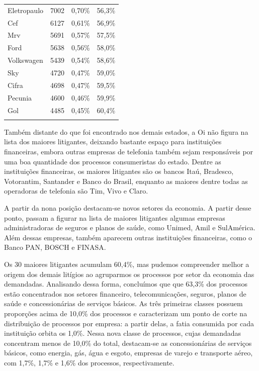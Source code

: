 \documentclass[]{report}
\begin{document}
\begin{longtable}{lrll}
  Eletropaulo & 7002 & 0,70\% & 56,3\% \\
  Cef & 6127 & 0,61\% & 56,9\% \\
  Mrv & 5691 & 0,57\% & 57,5\% \\
  Ford & 5638 & 0,56\% & 58,0\% \\
  Volkswagen & 5439 & 0,54\% & 58,6\% \\
  Sky & 4720 & 0,47\% & 59,0\% \\
  Cifra & 4698 & 0,47\% & 59,5\% \\
  Pecunia & 4600 & 0,46\% & 59,9\% \\
  Gol & 4485 & 0,45\% & 60,4\% \\
   \hline
\hline
\label{unnamed-chunk-30}
\end{longtable}

Também distante do que foi encontrado nos demais estados, a Oi não
figura na lista dos maiores litigantes, deixando bastante espaço para
instituições financeiras, embora outras empresas de telefonia também
sejam responsáveis por uma boa quantidade dos processos consumeristas do
estado. Dentre as instituições financeiras, os maiores litigantes são os
bancos Itaú, Bradesco, Votorantim, Santander e Banco do Brasil, enquanto
as maiores dentre todas as operadoras de telefonia são Tim, Vivo e
Claro.

A partir da nona posição destacam-se novos setores da economia. A partir
desse ponto, passam a figurar na lista de maiores litigantes algumas
empresas administradoras de seguros e planos de saúde, como Unimed, Amil
e SulAmérica. Além dessas empresas, também aparecem outras instituições
financeiras, como o Banco PAN, BOSCH e FINASA.

Os 30 maiores litigantes acumulam 60,4\%, mas pudemos compreender melhor
a origem dos demais litígios ao agruparmos os processos por setor da
economia das demandadas. Analisando dessa forma, concluímos que que
63,3\% dos processos estão concentrados nos setores financeiro,
telecomunicações, seguros, planos de saúde e concessionárias de serviços
básicos. As três primeiras classes possuem proporções acima de 10,0\%
dos processos e caracterizam um ponto de corte na distribuição de
processos por empresa: a partir delas, a fatia consumida por cada
instituição orbita os 1,0\%. Nessa nova classe de processos, cujas
demandadas concentram menos de 10,0\% do total, destacam-se as
concessionárias de serviços básicos, como energia, gás, água e esgoto,
empresas de varejo e transporte aéreo, com 1,7\%, 1,7\% e 1,6\% dos
processos, respectivamente.
\end{document}
